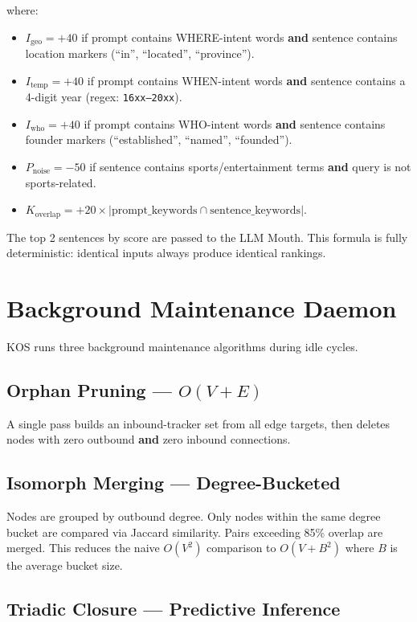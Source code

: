 \documentclass[11pt,a4paper]{article}
\begin{document}
\noindent where:
\begin{itemize}
  \item $I_{\mathrm{geo}} = +40$ if prompt contains WHERE-intent words \textbf{and} sentence contains location markers (``in'', ``located'', ``province'').
  \item $I_{\mathrm{temp}} = +40$ if prompt contains WHEN-intent words \textbf{and} sentence contains a 4-digit year (regex: \texttt{16xx--20xx}).
  \item $I_{\mathrm{who}} = +40$ if prompt contains WHO-intent words \textbf{and} sentence contains founder markers (``established'', ``named'', ``founded'').
  \item $P_{\mathrm{noise}} = -50$ if sentence contains sports/entertainment terms \textbf{and} query is not sports-related.
  \item $K_{\mathrm{overlap}} = +20 \times |\text{prompt\_keywords} \cap \text{sentence\_keywords}|$.
\end{itemize}

The top 2 sentences by score are passed to the LLM Mouth. This formula is fully deterministic: identical inputs always produce identical rankings.

\section{Background Maintenance Daemon}

KOS runs three background maintenance algorithms during idle cycles.

\subsection{Orphan Pruning --- $O(V + E)$}

A single pass builds an inbound-tracker set from all edge targets, then deletes nodes with zero outbound \textbf{and} zero inbound connections.

\subsection{Isomorph Merging --- Degree-Bucketed}

Nodes are grouped by outbound degree. Only nodes within the same degree bucket are compared via Jaccard similarity. Pairs exceeding 85\% overlap are merged. This reduces the naive $O(V^2)$ comparison to $O(V + B^2)$ where $B$ is the average bucket size.

\subsection{Triadic Closure --- Predictive Inference}
\end{document}
